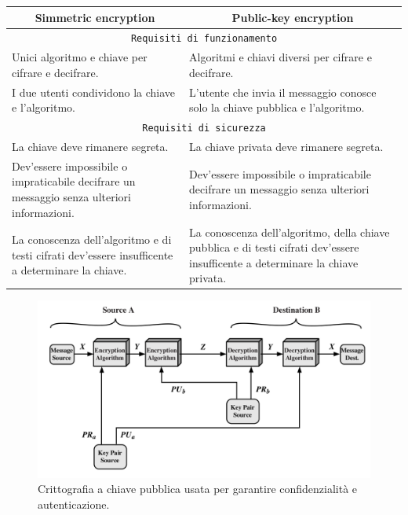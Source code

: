 \documentclass[a4paper, 11pt, twoside, openright, fleqn]{report}
\begin{document}
\begin{table}[htp]
	\renewcommand{\arraystretch}{1.3}
	\begin{tabularx}{\linewidth}{X|X}
		\toprule
		\multicolumn{1}{c|}{\textbf{Simmetric encryption}} & \multicolumn{1}{c}{\textbf{Public-key encryption}}\\
		\toprule
		\multicolumn{2}{c}{\texttt{Requisiti di funzionamento}}\\
		Unici algoritmo e chiave per cifrare e decifrare. & Algoritmi e chiavi diversi per cifrare e decifrare.\\
		I due utenti condividono la chiave e l'algoritmo. & L'utente che invia il messaggio conosce solo la chiave pubblica e l'algoritmo.\\
		\multicolumn{2}{c}{\texttt{Requisiti di sicurezza}}\\
		La chiave deve rimanere segreta. & La chiave privata deve rimanere segreta.\\
		Dev'essere impossibile o impraticabile decifrare un messaggio senza ulteriori informazioni. & Dev'essere impossibile o impraticabile decifrare un messaggio senza ulteriori informazioni.\\
		La conoscenza dell'algoritmo e di testi cifrati dev'essere insufficente a determinare la chiave. & La conoscenza dell'algoritmo, della chiave pubblica e di testi cifrati dev'essere insufficente a determinare la chiave privata.\\
		\bottomrule
	\end{tabularx}
\end{table}

\begin{figure}[htp]
	\centering
	\includegraphics[width=\textwidth]{images/PublicKey}
	\captionsetup{format=hang,width=.8\textwidth}
	\caption{Crittografia a chiave pubblica usata per garantire confidenzialità e autenticazione.}
\end{figure}
\end{document}
